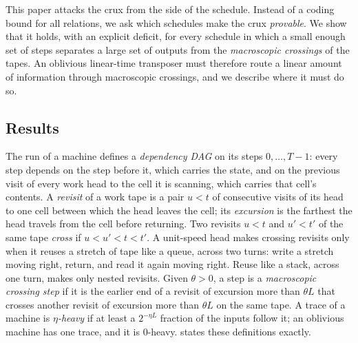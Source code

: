 This paper attacks the crux from the side of the schedule. Instead of a coding bound for all relations, we ask which schedules make the
crux \emph{provable}. We show that it holds, with an explicit deficit, for every schedule in which a small enough set of steps separates a
large set of outputs from the \emph{macroscopic crossings} of the tapes. An oblivious linear-time transposer must therefore route a linear
amount of information through macroscopic crossings, and we describe where it must do so.

\subsection{Results}

The run of a machine defines a \emph{dependency DAG} on its steps $0,\dots,T-1$: every step depends on the step before it, which
carries the state, and on the previous visit of every work head to the cell it is scanning, which carries that cell's
contents. A \emph{revisit} of a work tape is a pair $u<t$ of consecutive visits of its head to one cell between which the head leaves the
cell; its \emph{excursion} is the farthest the head travels from the cell before returning. Two revisits $u<t$ and $u'<t'$ of the same tape
\emph{cross} if $u<u'<t<t'$. A unit-speed head makes crossing revisits only when it reuses a stretch of tape like a queue, across two
turns: write a stretch moving right, return, and read it again moving right. Reuse like a stack, across one turn, makes only nested
revisits. Given $\theta>0$, a step is a \emph{macroscopic crossing step} if it is the earlier end of a revisit of excursion more than
$\theta L$ that crosses another revisit of excursion more than $\theta L$ on the same tape. A trace of a machine is \emph{$\eta$-heavy} if at
least a $2^{-\eta L}$ fraction of the inputs follow it; an oblivious machine has one trace, and it is $0$-heavy.  states
these definitions exactly.

